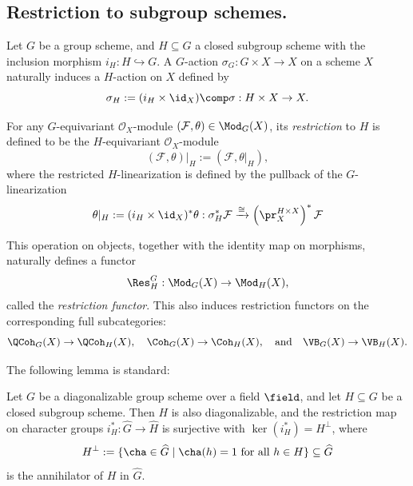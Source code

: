\subsection{Restriction to subgroup schemes.}

Let $G$ be a group scheme,
and $H\subseteq G$ a closed subgroup scheme
with the inclusion morphism $i_H : H \hookrightarrow G$.
A $G$-action
$\sigma_G : G \times X \rightarrow X$
on a scheme $X$ naturally induces a $H$-action on $X$ defined by
$$
\sigma_H
:=
(i_H \times \id_X)
\comp
\sigma
:
H\times X\rightarrow X.
$$


\begin{defn}\label{defn:RestrictionOfEquivariantSheaves}
For any $G$-equivariant $\mathcal{O}_X$-module $(\mathcal{F}, \theta) \in \Mod_G(X)$, its \emph{restriction} to $H$ is defined to be the $H$-equivariant $\mathcal{O}_X$-module
$$
(\mathcal{F}, \theta)|_H := (\mathcal{F}, \theta|_H),
$$
where the restricted $H$-linearization
is defined by the pullback of the $G$-linearization
$$
\theta|_H 
:= 
(i_H \times \id_X)^* \theta 
: 
\sigma_H^* \mathcal{F} 
\xrightarrow{\cong} 
\left(\pr_X^{H \times X}\right)^* \mathcal{F}
$$

This operation on objects, together with the identity map on morphisms, naturally defines a functor
$$
\Res_H^G : \Mod_G(X) \rightarrow \Mod_H(X),
$$
called the \emph{restriction functor}.
This also induces restriction functors on the corresponding full subcategories:
$$
\QCoh_G(X) \rightarrow \QCoh_H(X),
\quad
\Coh_G(X) \rightarrow \Coh_H(X),
\quad\text{and}\quad
\VB_G(X) \rightarrow \VB_H(X).
$$
\end{defn}


The following lemma is standard:

\begin{lemma}\cite[Exercise 2.8]{Waterhouse}
\label{lem:DiagonalizableSurjective}
Let $G$ be a diagonalizable group scheme
over a field $\field$,
and let $H \subseteq G$ be a closed subgroup scheme.
Then $H$ is also diagonalizable, and the restriction map on character groups
$
i_H^* : \widehat{G} \rightarrow \widehat{H}
$
is surjective with $\ker(i_H^*) = H^\perp$,
where
$$
H^\perp
:=
\{ \cha \in \widehat{G} \mid \cha(h) = 1 \text{ for all } h \in H \}
\subseteq
\widehat{G}
$$
is the annihilator of $H$ in $\widehat{G}$.
\end{lemma}

